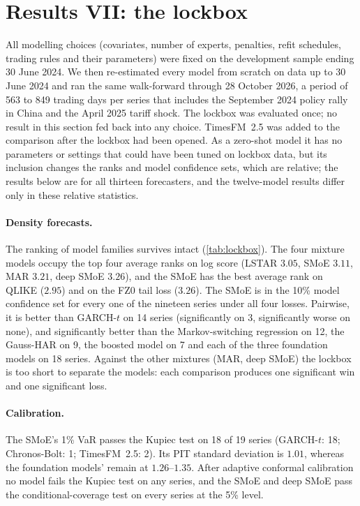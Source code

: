 \section{Results VII: the lockbox}\label{sec:lockbox}

All modelling choices (covariates, number of experts, penalties, refit schedules, trading rules and
their parameters) were fixed on the development sample ending 30 June 2024. We then re-estimated every
model from scratch on data up to 30 June 2024 and ran the same walk-forward through 28 October 2026,
a period of 563 to 849 trading days per series that includes the September 2024 policy rally in China
and the April 2025 tariff shock. The lockbox was evaluated once; no result in
this section fed back into any choice. TimesFM~2.5 was added to the comparison after the lockbox had
been opened. As a zero-shot model it has no parameters or settings that could have been tuned on
lockbox data, but its inclusion changes the ranks and model confidence sets, which are relative; the
results below are for all thirteen forecasters, and the twelve-model results differ only in these
relative statistics.

\paragraph{Density forecasts.} The ranking of model families survives intact (\cref{tab:lockbox}). The
four mixture models occupy the top four average ranks on log score (LSTAR $3.05$, SMoE $3.11$, MAR
$3.21$, deep SMoE $3.26$), and the SMoE has the best average rank on QLIKE ($2.95$) and on the FZ0 tail
loss ($3.26$). The SMoE is in the 10\% model confidence set for every one of the nineteen series under
all four losses. Pairwise, it is better than GARCH-$t$ on 14 series (significantly on 3, significantly
worse on none), and significantly better than the Markov-switching regression on 12, the Gauss-HAR on
9, the boosted model on 7 and each of the three foundation models on 18 series. Against the other mixtures (MAR,
deep SMoE) the lockbox is too short to separate the models: each comparison produces one significant
win and one significant loss.

\paragraph{Calibration.} The SMoE's 1\% VaR passes the Kupiec test on 18 of 19 series (GARCH-$t$: 18;
Chronos-Bolt: 1; TimesFM~2.5: 2). Its PIT standard deviation is $1.01$, whereas the foundation
models' remain at $1.26$--$1.35$. After adaptive conformal calibration no model fails the Kupiec test on any series, and
the SMoE and deep SMoE pass the conditional-coverage test on every series at the 5\% level.

